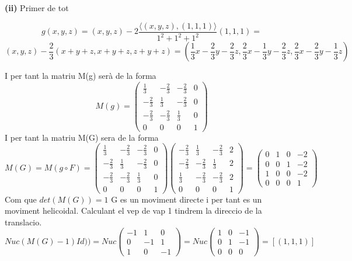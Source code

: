 \documentclass[12pt, a4papre]{article}
\begin{document}
	\textbf{(ii)} 
	Primer de tot 
	\begin{center}
	\[
	g(x,y,z)=(x,y,z)-2\frac{\langle (x,y,z), (1,1,1) \rangle}{1^2+1^2+1^2}(1,1,1)=
	\]
	\[
	(x,y,z)-\frac{2}{3}(x+y+z,x+y+z,z+y+z)=(\frac{1}{3}x-\frac{2}{3}y-\frac{2}{3}z,\frac{2}{3}x-\frac{1}{3}y-\frac{2}{3}z,\frac{2}{3}x-\frac{2}{3}y-\frac{1}{3}z)
	\]
	\end{center}
	I per tant la matriu M(g) serà de la forma
	\[
	M(g)=
	\begin{pmatrix}
		\frac{1}{3}		&	-\frac{2}{3}	&	-\frac{2}{3}	&	0\\
		-\frac{2}{3}	&	\frac{1}{3}		&	-\frac{2}{3}	&	0\\
		-\frac{2}{3}	&	-\frac{2}{3}  	&	\frac{1}{3}		&	0\\
		0			&	0			& 	0			&	1 
	\end{pmatrix}
	\]
	I per tant la matriu M(G) sera de la forma
	\[
	M(G)=M(g\circ F)=
	\begin{pmatrix}
		\frac{1}{3}		&	-\frac{2}{3}	&	-\frac{2}{3}	&	0\\
		-\frac{2}{3}	&	\frac{1}{3}		&	-\frac{2}{3}	&	0\\
		-\frac{2}{3}	&	-\frac{2}{3}  	&	\frac{1}{3}		&	0\\
		0			&	0			& 	0			&	1 
	\end{pmatrix}
	\begin{pmatrix}
		-\frac{2}{3}	&	\frac{1}{3}		&	-\frac{2}{3}	&	2\\
		-\frac{2}{3}	&	-\frac{2}{3}	&	\frac{1}{3}		&	2\\
		\frac{1}{3}		&	-\frac{2}{3}  	&	-\frac{2}{3}	&	2\\
		0			&	0			& 	0			&	1 
	\end{pmatrix}
	=
	\begin{pmatrix}
		0	&	1	&	0	&	-2\\
		0	&	0	&	1	&	-2\\
		1	&	0  	&	0	&	-2\\
		0	&	0	& 	0	&	1
	\end{pmatrix}
	\]
	Com que $det(M(G))=1$ G es un moviment directe i per tant es un moviment helicoidal. Calculant el vep de vap 1 tindrem la direccio de la translacio.
	\[
	Nuc(M(G)-1)Id))=Nuc
	\begin{pmatrix}
		-1	&	1	&	0\\
		0	&	-1	&	1\\
		1	&	0  	&	-1
	\end{pmatrix}
	=
	Nuc
	\begin{pmatrix}
		1	&	0	&	-1\\
		0	&	1	&	-1\\
		0	&	0  	&	0
	\end{pmatrix}
	=
	[(1,1,1)]
	\]
\end{document}
